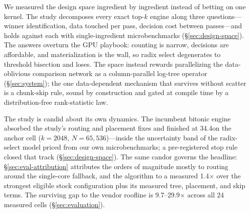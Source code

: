 We measured the design space ingredient by ingredient instead of betting on
one kernel. The study decomposes every exact top-$k$ engine along three
questions---winner identification, data touched per pass, decision cost
between passes---and holds \bh against each with
single-ingredient microbenchmarks (\S\ref{sec:design-space}). The answers
overturn the GPU playbook: counting is narrow, decisions are affordable, and
materialization is the wall, so radix select degenerates to threshold
bisection and loses. The space instead rewards parallelizing the
data-oblivious comparison network as a column-parallel log-tree operator
(\S\ref{sec:system}); the one data-dependent mechanism that survives without
scatter is a chunk-skip rule, sound by construction and gated at
compile time by a distribution-free rank-statistic law.

The study is candid about its own dynamics. The incumbent bitonic engine
absorbed the study's routing and placement fixes and finished at 34.4\us on
the anchor cell ($k{=}2048$, $N{=}65{,}536$)---inside the uncertainty band
of the radix-select model priced from our own microbenchmarks; a
pre-registered stop rule closed that track (\S\ref{sec:design-space}).
The same candor governs the headline: \S\ref{sec:eval-attribution}
attributes the orders of magnitude mostly to routing around the
single-core fallback, and the algorithm to a measured 1.4$\times$ over
the strongest eligible stock configuration plus its measured tree,
placement, and skip terms. The surviving gap to the
vendor roofline is 9.7--29.9$\times$ across all 24 measured cells
(\S\ref{sec:evaluation}).

